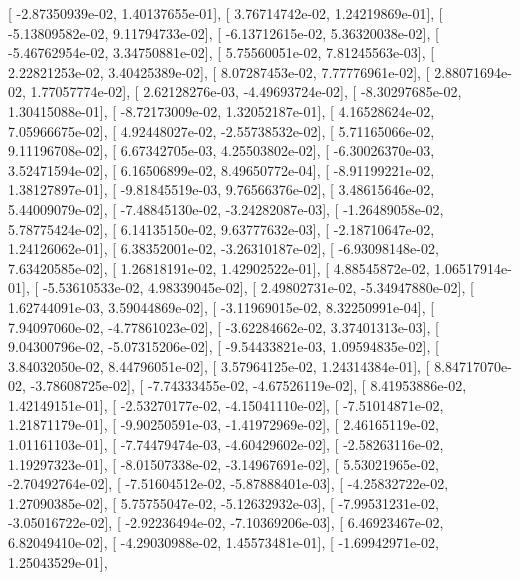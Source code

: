 \documentclass{article}
\begin{document}
       [ -2.87350939e-02,   1.40137655e-01],
       [  3.76714742e-02,   1.24219869e-01],
       [ -5.13809582e-02,   9.11794733e-02],
       [ -6.13712615e-02,   5.36320038e-02],
       [ -5.46762954e-02,   3.34750881e-02],
       [  5.75560051e-02,   7.81245563e-03],
       [  2.22821253e-02,   3.40425389e-02],
       [  8.07287453e-02,   7.77776961e-02],
       [  2.88071694e-02,   1.77057774e-02],
       [  2.62128276e-03,  -4.49693724e-02],
       [ -8.30297685e-02,   1.30415088e-01],
       [ -8.72173009e-02,   1.32052187e-01],
       [  4.16528624e-02,   7.05966675e-02],
       [  4.92448027e-02,  -2.55738532e-02],
       [  5.71165066e-02,   9.11196708e-02],
       [  6.67342705e-03,   4.25503802e-02],
       [ -6.30026370e-03,   3.52471594e-02],
       [  6.16506899e-02,   8.49650772e-04],
       [ -8.91199221e-02,   1.38127897e-01],
       [ -9.81845519e-03,   9.76566376e-02],
       [  3.48615646e-02,   5.44009079e-02],
       [ -7.48845130e-02,  -3.24282087e-03],
       [ -1.26489058e-02,   5.78775424e-02],
       [  6.14135150e-02,   9.63777632e-03],
       [ -2.18710647e-02,   1.24126062e-01],
       [  6.38352001e-02,  -3.26310187e-02],
       [ -6.93098148e-02,   7.63420585e-02],
       [  1.26818191e-02,   1.42902522e-01],
       [  4.88545872e-02,   1.06517914e-01],
       [ -5.53610533e-02,   4.98339045e-02],
       [  2.49802731e-02,  -5.34947880e-02],
       [  1.62744091e-03,   3.59044869e-02],
       [ -3.11969015e-02,   8.32250991e-04],
       [  7.94097060e-02,  -4.77861023e-02],
       [ -3.62284662e-02,   3.37401313e-03],
       [  9.04300796e-02,  -5.07315206e-02],
       [ -9.54433821e-03,   1.09594835e-02],
       [  3.84032050e-02,   8.44796051e-02],
       [  3.57964125e-02,   1.24314384e-01],
       [  8.84717070e-02,  -3.78608725e-02],
       [ -7.74333455e-02,  -4.67526119e-02],
       [  8.41953886e-02,   1.42149151e-01],
       [ -2.53270177e-02,  -4.15041110e-02],
       [ -7.51014871e-02,   1.21871179e-01],
       [ -9.90250591e-03,  -1.41972969e-02],
       [  2.46165119e-02,   1.01161103e-01],
       [ -7.74479474e-03,  -4.60429602e-02],
       [ -2.58263116e-02,   1.19297323e-01],
       [ -8.01507338e-02,  -3.14967691e-02],
       [  5.53021965e-02,  -2.70492764e-02],
       [ -7.51604512e-02,  -5.87888401e-03],
       [ -4.25832722e-02,   1.27090385e-02],
       [  5.75755047e-02,  -5.12632932e-03],
       [ -7.99531231e-02,  -3.05016722e-02],
       [ -2.92236494e-02,  -7.10369206e-03],
       [  6.46923467e-02,   6.82049410e-02],
       [ -4.29030988e-02,   1.45573481e-01],
       [ -1.69942971e-02,   1.25043529e-01],
\end{document}
